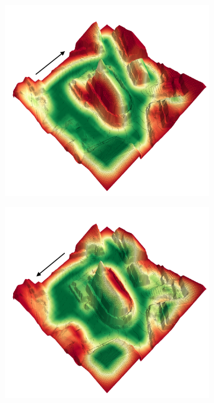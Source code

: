 \documentclass[../document.tex]{subfiles}
\begin{document}
  \begin{figure} [htbp]
    \centering
    \begin{subfigure}[b]{0.45\textwidth}
      \includegraphics[width=\linewidth]{../img/4/traversability/sullens-church/-270.png} 
    \end{subfigure}
    \begin{subfigure}[b]{0.45\textwidth}
        \includegraphics[width=\linewidth]{../img/4/traversability/sullens-church/-90.png}

\end{subfigure}
\end{figure}
\end{document}
